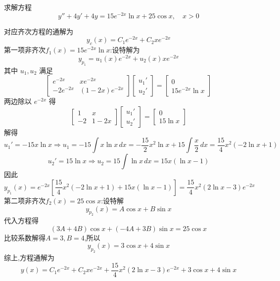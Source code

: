 \begin{questions}
    \question 求解方程
    \[
    y'' + 4y' + 4y = 15 e^{-2x} \ln x + 25 \cos x, \quad x>0
    \]
    \begin{solution}
        对应齐次方程的通解为
        \[
        y_c(x) = C_1 e^{-2x} + C_2 x e^{-2x}
        \]
        第一项非齐次$f_1(x) = 15 e^{-2x} \ln x$:设特解为
        \[
        y_{p_1} = u_1(x) e^{-2x} + u_2(x) x e^{-2x}
        \]
        其中 $u_1,u_2$ 满足
        \[
        \begin{bmatrix} e^{-2x} & x e^{-2x} \\ -2e^{-2x} & (1-2x)e^{-2x} \end{bmatrix} 
        \begin{bmatrix} u_1' \\ u_2' \end{bmatrix} =
        \begin{bmatrix} 0 \\ 15 e^{-2x} \ln x \end{bmatrix}
        \]
        两边除以 $e^{-2x}$ 得
        \[
        \begin{bmatrix} 1 & x \\ -2 & 1-2x \end{bmatrix} 
        \begin{bmatrix} u_1' \\ u_2' \end{bmatrix} =
        \begin{bmatrix} 0 \\ 15 \ln x \end{bmatrix}
        \]
        解得
        \[
        u_1' = -15 x \ln x \Rightarrow u_1 = -15 \int x \ln x \, dx = -\frac{15}{2} x^2 \ln x + 15 \int \frac{x}{2}\,dx = \frac{15}{4} x^2(-2\ln x+1)
        \]
        \[
        u_2' = 15 \ln x \Rightarrow u_2 = 15 \int \ln x\, dx = 15 x (\ln x - 1)
        \]
        因此
        \[
        y_{p_1}(x) = e^{-2x} \left[ \frac{15}{4} x^2(-2\ln x+1) + 15 x (\ln x -1) \right] = \frac{15}{4} x^2 (2\ln x -3) e^{-2x}
        \]
        第二项非齐次$f_2(x) = 25 \cos x$:设特解
        \[
        y_{p_2}(x) = A \cos x + B \sin x
        \]
        代入方程得
        \[
        (3A+4B) \cos x + (-4A+3B) \sin x = 25 \cos x
        \]
        比较系数解得$A=3, B=4$,所以
        \[
        y_{p_2}(x) = 3 \cos x + 4 \sin x
        \]
        综上,方程通解为
        \[
        y(x) = C_1 e^{-2x} + C_2 x e^{-2x} + \frac{15}{4} x^2 (2\ln x -3) e^{-2x} + 3 \cos x + 4 \sin x
        \]
    \end{solution}


\end{questions}
